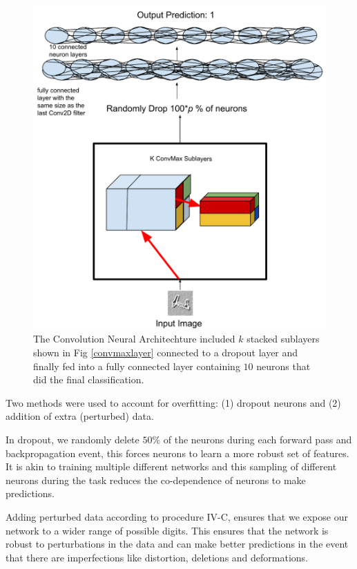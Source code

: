 \documentclass[conference]{IEEEtran}
\begin{document}
\begin{figure}[h]
	\includegraphics[scale=0.5]{architecture.pdf}
	\caption{The Convolution Neural Architechture included $k$ stacked sublayers shown in Fig \ref{convmaxlayer} connected to a dropout layer and finally fed into a fully connected layer containing $10$ neurons that did the final classification.}
	\label{CNNarch}
\end{figure}

Two methods were used to account for overfitting: (1) dropout\cite{dropout} neurons and (2) addition of extra (perturbed) data. 

In dropout, we randomly delete $50\%$ of the neurons during each forward pass and backpropagation event, this forces neurons to learn a more robust set of features. It is akin to training multiple different networks and this sampling of different neurons during the task reduces the co-dependence of neurons to make predictions. 

Adding perturbed data according to procedure IV-C, ensures that we expose our network to a wider range of possible digits. This ensures that the network is robust to perturbations in the data and can make better predictions in the event that there are imperfections like distortion, deletions and deformations.
\end{document}
